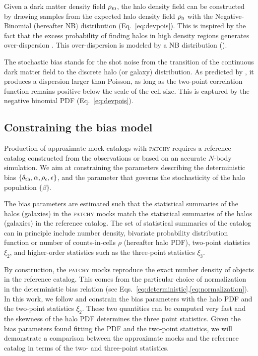 Given a dark matter density field $\rho_{\rm m}$, the halo density field can be constructed by drawing samples from the expected halo density field $\rho_{\rm h}$ with the Negative-Binomial (hereafter NB) distribution (Eq.~\ref{eq:devpois}). This is inspired by the fact that the excess probability of finding halos in high density regions generates over-dispersion \citep[][]{somerville2001,Casas-Miranda:2002aa}. This over-dispersion is modeled by a NB distribution (\citealt{kitaura2014,neyrinck2014}). 

The stochastic bias stands for the shot noise from the transition of the continuous dark matter field to the discrete halo (or galaxy) distribution. As predicted by \citet{peebles80}, it produces a dispersion larger than Poisson, as long as the two-point correlation function remains positive below the scale of the cell size. This is captured by the negative binomial PDF (Eq.~\ref{eq:devpois}).

\subsection{Constraining the bias model}
\label{sec:mcmc}

Production of approximate mock catalogs with \textsc{patchy} requires a reference catalog constructed from the observations or based on an accurate $N$-body simulation. 
We aim at constraining the parameters describing the deterministic bias $\{\delta_{\rm th},\alpha, \rho_{\epsilon},\epsilon\}$, and the parameter that governs the stochasticity of the halo population $\{\beta\}$.

The bias parameters are estimated such that the statistical summaries of the halos (galaxies) in the \textsc{patchy} mocks match the statistical summaries of the halos (galaxies) in the reference catalog. The set of statistical summaries of the catalog can in principle include number density, bivariate probability distribution function or number of counts-in-cells $\rho$ (hereafter halo PDF), two-point statistics $\xi_{2}$, and higher-order statistics such as the three-point statistics $\xi_{3}$. 

By construction, the \textsc{patchy} mocks reproduce the exact number density of objects in the reference catalog. This comes from the particular choice of normalization in the deterministic bias relation (see Eqs.~\ref{eq:deterministic},\ref{eq:normalization}). In this work, we follow \citet{kitaura2015} and constrain the bias parameters with the halo PDF and the two-point statistics $\xi_{2}$. These two quantities can be computed very fast and the skewness of the halo PDF determines the three point statistics. Given the bias parameters found fitting the PDF and the two-point statistics, we will demonstrate a comparison between the approximate mocks and the reference catalog in terms of the two- and three-point statistics. 


